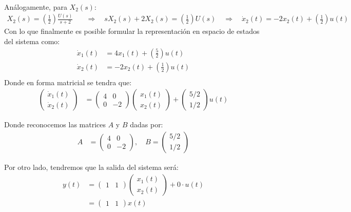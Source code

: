 \documentclass[
  11pt,
  letterpaper,
   addpoints,
  answers
  ]{exam}
\begin{document}
\begin{questions}
\begin{solution}
\begin{align}
\end{align}
Análogamente, para $X_2(s)$:
\begin{align}
  X_2(s) = \left(\frac{1}{2}\right)\frac{U(s)}{s+2} \quad &\Longrightarrow \quad sX_2(s) + 2X_2(s) = \left(\frac{1}{2}\right)U(s) \quad \Longrightarrow \quad \dot{x}_2(t) = -2x_2(t) + \left(\frac{1}{2}\right)u(t)
\end{align}
Con lo que finalmente es posible formular la representación en espacio de estados del sistema como:
\begin{align}
  \dot{x}_1(t) &= 4x_1(t) + \left(\frac{5}{2}\right)u(t) \\
  \dot{x}_2(t) &= -2x_2(t) + \left(\frac{1}{2}\right)u(t) \\
\end{align}
Donde en forma matricial se tendra que:
\begin{align}
  \begin{pmatrix}
    \dot{x}_1(t) \\ \dot{x}_2(t)
  \end{pmatrix}
  &=
  \begin{pmatrix}
    4 & 0 \\
    0 & -2
  \end{pmatrix}
  \begin{pmatrix}
    x_1(t) \\ x_2(t)
  \end{pmatrix}
  +
  \begin{pmatrix}
   5/2 \\
    1/2
  \end{pmatrix}
  u(t) 
\end{align}

Donde reconocemos las matrices $A$ y $B$ dadas por:
\begin{align}
  A &= \begin{pmatrix}
    4 & 0 \\
    0 & -2
  \end{pmatrix}, \quad
  B = \begin{pmatrix}
    5/2 \\ 1/2
  \end{pmatrix}
\end{align}

Por otro lado, tendremos que la salida del sistema será:
\begin{align}
  y(t) &= \begin{pmatrix} 1 & 1 \end{pmatrix} \begin{pmatrix} x_1(t) \\ x_2(t) \end{pmatrix} + 0 \cdot u(t) \\
  &= \begin{pmatrix} 1 & 1 \end{pmatrix} x(t) 
\end{align}
  


\end{solution}
\end{questions}
\end{document}
